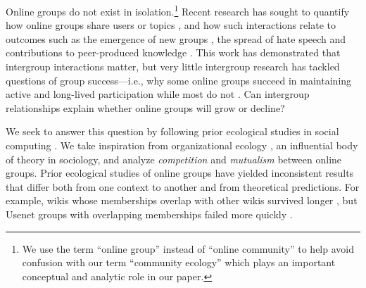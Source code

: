 \documentclass[letterpaper]{article}\usepackage[]{graphicx}\usepackage[]{color}
\begin{document}
Online groups do not exist in isolation.\footnote{We use the term ``online group'' instead of ``online community'' to help avoid confusion with our term ``community ecology'' which plays an important conceptual and analytic role in our paper.}  Recent research has sought to quantify how online groups share users or topics \cite{datta_identifying_2017}, and how such interactions relate to outcomes such as the emergence of new groups \cite{tan_tracing_2018}, the spread of hate speech \cite{chandrasekharan_you_2017} and contributions to peer-produced knowledge \cite{vincent_examining_2018}.  This work has demonstrated that intergroup interactions matter, but very little intergroup research has tackled questions of group success---i.e., why some online groups succeed in maintaining active and long-lived participation while most do not \cite{kraut_role_2014, resnick_starting_2012}. %
Can intergroup relationships 
explain whether online groups will grow or decline?





We seek to answer this question by following prior ecological studies in social computing \cite{wang_impact_2012, zhu_impact_2014, zhu_selecting_2014}. We take inspiration from organizational ecology \cite{hannan_organizational_1989, baum_ecological_2006}, an influential body of theory in sociology, and analyze \emph{competition} and \emph{mutualism} between online groups. 
Prior ecological studies of online groups have yielded inconsistent results that differ both from one context to another and from theoretical predictions. 
For example, wikis whose memberships overlap with other wikis survived longer \cite{zhu_selecting_2014}, but Usenet groups with overlapping memberships failed more quickly \cite{wang_impact_2012}. 
\end{document}
